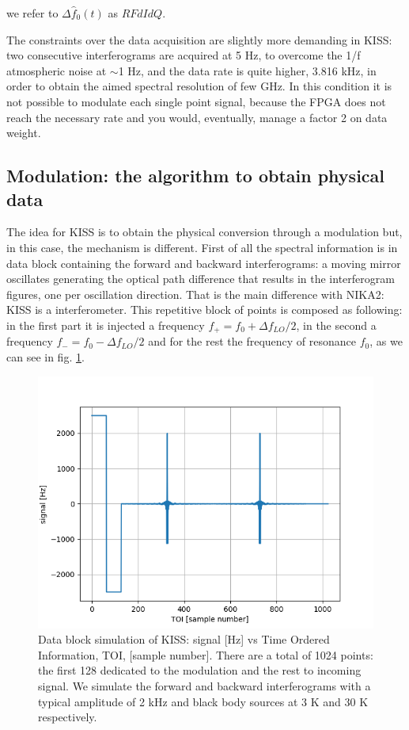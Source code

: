 \documentclass[twocolumn,traditabstract]{aa}\\
\begin{document}
\noindent we refer to $\Delta \hat{f}_0 (t)$ as $RFdIdQ$.

The constraints over the data acquisition are slightly more demanding in KISS: two consecutive interferograms are acquired at 5 Hz, to overcome the 1/f atmospheric noise at $\sim$1 Hz, and the data rate is quite higher, 3.816 kHz, in order to obtain the aimed spectral resolution of few GHz. In this condition it is not possible to modulate each single point signal, because the FPGA does not reach the necessary rate and you would, eventually, manage a factor 2 on data weight.

\subsection{Modulation: the algorithm to obtain physical data}
\label{sebsec:alg}

The idea for KISS is to obtain the physical conversion through a modulation but, in this case, the mechanism is different. First of all the spectral information is in data block containing the forward and backward interferograms: a moving mirror oscillates generating the optical path difference that results in the interferogram figures, one per oscillation direction. That is the main difference with NIKA2: KISS is a interferometer. This repetitive block of points is composed as following: in the first part it is injected a frequency $f_+ = f_0 + \Delta f_{LO}/2$, in the second a frequency $f_- = f_0 - \Delta f_{LO}/2$ and for the rest the frequency of resonance $f_0$, as we can see in fig. \ref{fig:mod}.

\begin{figure}[htf]
	\centering
	\includegraphics[width=.5\textwidth]{3.acqui/block_data.png}
	\caption{Data block simulation of KISS: signal [Hz] vs Time Ordered Information, TOI, [sample number]. There are a total of 1024 points: the first 128 dedicated to the modulation and the rest to incoming signal. We simulate the forward and backward interferograms with a typical amplitude of 2 kHz and black body sources at 3 K and 30 K respectively.}
	\label{fig:mod}
\end{figure}
\end{document}

